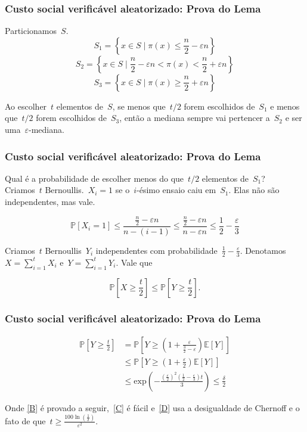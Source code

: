 \documentclass[usenames,dvipsnames]{beamer}
\begin{document}
\begin{frame}
\frametitle{Custo social verificável aleatorizado: Prova do Lema}
Particionamos~$S$.
$$S_1 = \left\{ x \in S \mid \pi(x) \leq \frac{n}{2} - \varepsilon n \right\}$$
$$S_2 = \left\{ x \in S \mid \frac{n}{2} - \varepsilon n < \pi(x) < \frac{n}{2} + \varepsilon n\right\}$$
$$S_3 = \left\{ x \in S \mid \pi(x) \geq \frac{n}{2} + \varepsilon n \right\}$$

Ao escolher~$t$ elementos de~$S$, se menos que~$t/2$ forem escolhidos de~$S_1$ e menos que~$t/2$ forem escolhidos de~$S_3$, então a mediana sempre vai pertencer a~$S_2$ e ser uma~$\varepsilon$-mediana.
\end{frame}

\begin{frame}
\frametitle{Custo social verificável aleatorizado: Prova do Lema}
Qual é a probabilidade de escolher menos do que~$t/2$ elementos de~$S_1$? \\

Criamos~$t$ Bernoullis.~$X_i = 1$ se o~$i$-ésimo ensaio caiu em~$S_1$. Elas não são independentes, mas vale.

\begin{equation*}
\mathbb{P}[X_i = 1] \leq \frac{\frac{n}{2} - \varepsilon n}{n - (i-1)} \leq \frac{\frac{n}{2} - \varepsilon n}{n - \varepsilon n} \leq \frac{1}{2} - \frac{\varepsilon}{3}
\end{equation*}

Criamos~$t$ Bernoullis~$Y_i$ independentes com probabilidade~$\frac{1}{2} - \frac{\varepsilon}{3}$. Denotamos~$X = \sum\limits_{i=1}^t X_i$ e~$Y = \sum\limits_{i=1}^t Y_i$. Vale que

$$ \mathbb{P}\left[ X \geq \frac{t}{2} \right] \leq \mathbb{P}\left[ Y \geq \frac{t}{2} \right] \text{.} $$
\end{frame}

\begin{frame}
\frametitle{Custo social verificável aleatorizado: Prova do Lema}

\begin{align}
\mathbb{P}\left[ Y \geq \frac{t}{2} \right] & = \mathbb{P}\left[ Y  \geq \left( 1 + \frac{\varepsilon}{\frac{3}{2} - \varepsilon} \right) \mathbb{E}\left[ Y \right]  \right] \label{B} \\
& \leq \mathbb{P}\left[ Y \geq \left(1 + \frac{\varepsilon}{2}\right) \mathbb{E}\left[ Y \right] \right] \label{C} \\
& \leq \text{exp}\left( - \frac{\left(\frac{\varepsilon}{2}\right)^2\left(\frac{1}{2} - \frac{\varepsilon}{3} \right)t}{3} \right) \leq \frac{\delta}{2} \label{D}
\end{align}


Onde \eqref{B} é provado a seguir,~\eqref{C} é fácil e~\eqref{D} usa a desigualdade de Chernoff e o fato de que~$t \geq \frac{100\ln(\frac{1}{\delta})}{\varepsilon^2}$.

\end{frame}
\end{document}
